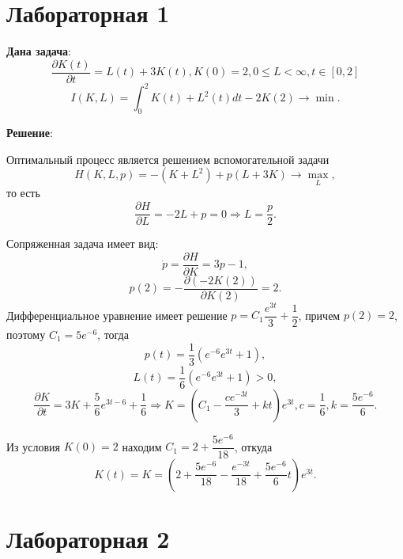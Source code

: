 \documentclass[a4paper, 12pt]{article}
\newcommand{\df}[2]{\frac{\partial #1}{\partial #2}}
\begin{document}
\section{Лабораторная 1}
{\bf Дана задача}:
\begin{equation}
    \dfrac{\partial K(t)}{\partial t}=L(t)+3K(t), K(0)=2,0\le L < \infty, t \in [0,2]
\end{equation}    
\begin{equation}
    I(K,L)=\int_0^2 K(t)+L^2(t) dt - 2 K(2) \rightarrow \min.
\end{equation}

{\bf Решение}:

Оптимальный процесс является решением вспомогательной задачи
\begin{equation}
    H(K,L,p)=-(K+L^2)+p(L+3K)\rightarrow \max_L,
\end{equation}
то есть 
\begin{equation}
   \df{H}{L}=-2L+p=0 \Rightarrow L=\frac{p}{2}.
\end{equation}

Сопряженная задача имеет вид:
\begin{equation}
    \dot p = \df{H}{K}=3p-1,
\end{equation}
\begin{equation}
    p(2)=-\df{(-2K(2))}{K(2)}=2.
\end{equation}
Дифференциальное уравнение имеет решение $p=C_1 \dfrac{e^{3t}}{3} +\dfrac{1}{2}$, причем $p(2)=2$, поэтому $C_1=5 e^{-6}$, тогда
\begin{equation}
    p(t)=\dfrac{1}{3}\left(e^{-6} e^{3t}+1 \right) ,
\end{equation}
\begin{equation}
    L(t)=\dfrac{1}{6}\left(e^{-6} e^{3t}+1 \right)>0,
\end{equation}
\begin{equation}
    \df{K}{t}=3K+\dfrac{5}{6} e^{3t-6}+\dfrac{1}{6} \Rightarrow K=\left(C_1- \dfrac{c e^{-3t}}{3}+kt\right) e^{3t},c=\dfrac{1}{6},k=\dfrac{5 e^{-6}}{6}.
\end{equation}

Из условия $K(0)=2$ находим $C_1=2+\dfrac{5 e^{-6}}{18}$, откуда 
\begin{equation}
    K(t)=K=\left(2+\dfrac{5 e^{-6}}{18}- \dfrac{e^{-3t}}{18}+\dfrac{5 e^{-6}}{6} t\right) e^{3t}.
\end{equation}


\section{Лабораторная 2}
\end{document}
